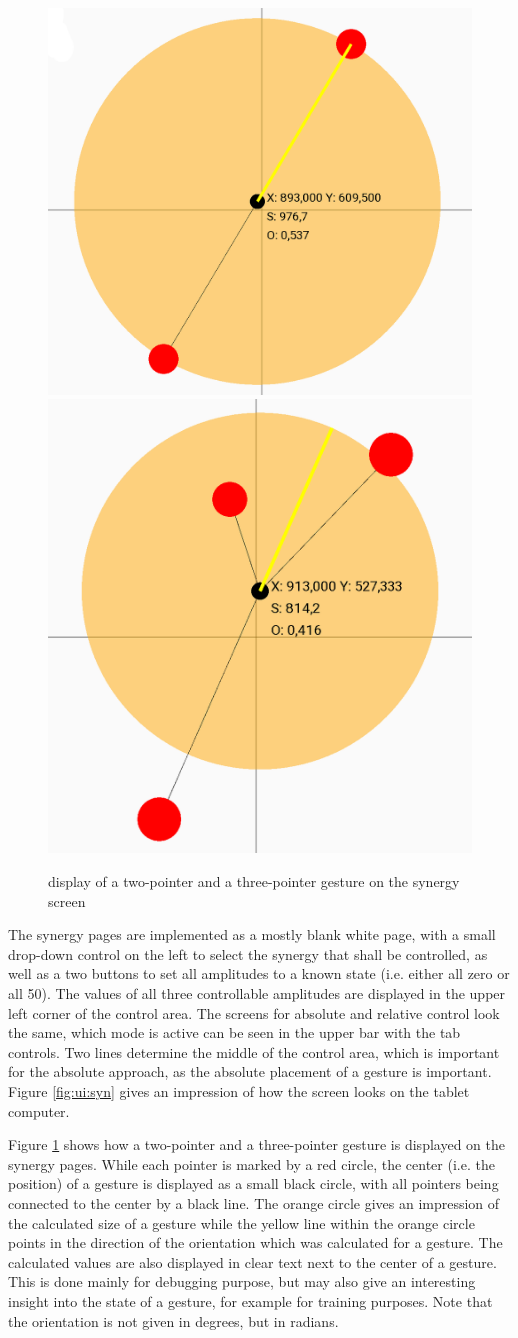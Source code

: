 \begin{figure}
	\caption{display of a two-pointer and a three-pointer gesture on the synergy screen\label{fig:ui:syngest}}
	
	\includegraphics[width=0.5\linewidth]{assets/chpt_impl/syn_2touch}
	\includegraphics[width=0.5\linewidth]{assets/chpt_impl/syn_3touch}
\end{figure}

The synergy pages are implemented as a mostly blank white page, with a small drop-down control on the left to select the synergy that shall be controlled, as well as a two buttons to set all amplitudes to a known state (i.e. either all zero or all 50). The values of all three controllable amplitudes are displayed in the upper left corner of the control area. The screens for absolute and relative control look the same, which mode is active can be seen in the upper bar with the tab controls. Two lines determine the middle of the control area, which is important for the absolute approach, as the absolute placement of a gesture is important. Figure \ref{fig:ui:syn} gives an impression of how the screen looks on the tablet computer.

Figure \ref{fig:ui:syngest} shows how a two-pointer and a three-pointer gesture is displayed on the synergy pages. While each pointer is marked by a red circle, the center (i.e. the position) of a gesture is displayed as a small black circle, with all pointers being connected to the center by a black line. The orange circle gives an impression of the calculated size of a gesture while the yellow line within the orange circle points in the direction of the orientation which was calculated for a gesture. The calculated values are also displayed in clear text next to the center of a gesture. This is done mainly for debugging purpose, but may also give an interesting insight into the state of a gesture, for example for training purposes. Note that the orientation is not given in degrees, but in radians.

